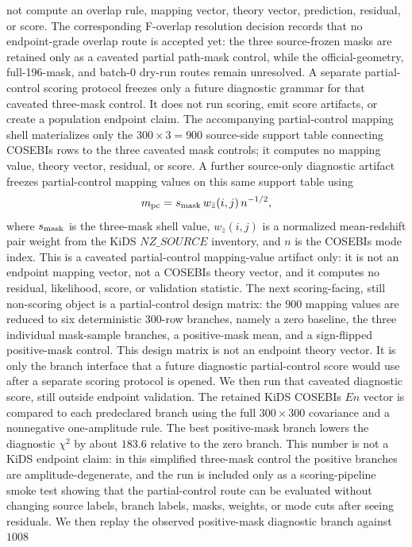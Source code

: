 \documentclass[11pt]{article}
\begin{document}
not compute an overlap rule, mapping vector, theory vector, prediction,
residual, or score.
The corresponding F-overlap resolution decision records that no endpoint-grade
overlap route is accepted yet: the three source-frozen masks are retained only
as a caveated partial path-mask control, while the official-geometry,
full-196-mask, and batch-0 dry-run routes remain unresolved.
A separate partial-control scoring protocol freezes only a future diagnostic
grammar for that caveated three-mask control. It does not run scoring, emit
score artifacts, or create a population endpoint claim.
The accompanying partial-control mapping shell materializes only the
\(300\times3=900\) source-side support table connecting COSEBIs rows to the
three caveated mask controls; it computes no mapping value, theory vector,
residual, or score.
A further source-only diagnostic artifact freezes partial-control mapping
values on this same support table using
\[
  m_{\rm pc} =
  s_{\rm mask}\,
  w_{\bar z}(i,j)\,
  n^{-1/2},
\]
where \(s_{\rm mask}\) is the three-mask shell value, \(w_{\bar z}(i,j)\) is a
normalized mean-redshift pair weight from the KiDS \(NZ\_SOURCE\) inventory,
and \(n\) is the COSEBIs mode index. This is a caveated partial-control
mapping-value artifact only: it is not an endpoint mapping vector, not a
COSEBIs theory vector, and it computes no residual, likelihood, score, or
validation statistic.
The next scoring-facing, still non-scoring object is a partial-control design
matrix: the \(900\) mapping values are reduced to six deterministic 300-row
branches, namely a zero baseline, the three individual mask-sample branches, a
positive-mask mean, and a sign-flipped positive-mask control. This design
matrix is not an endpoint theory vector. It is only the branch interface that a
future diagnostic partial-control score would use after a separate scoring
protocol is opened.
We then run that caveated diagnostic score, still outside endpoint validation.
The retained KiDS COSEBIs \(En\) vector is compared to each predeclared branch
using the full \(300\times300\) covariance and a nonnegative one-amplitude rule.
The best positive-mask branch lowers the diagnostic \(\chi^2\) by about
\(183.6\) relative to the zero branch. This number is not a KiDS endpoint
claim: in this simplified three-mask control the positive branches are
amplitude-degenerate, and the run is included only as a scoring-pipeline smoke
test showing that the partial-control route can be evaluated without changing
source labels, branch labels, masks, weights, or mode cuts after seeing
residuals.
We then replay the observed positive-mask diagnostic branch against \(1008\)
\end{document}
